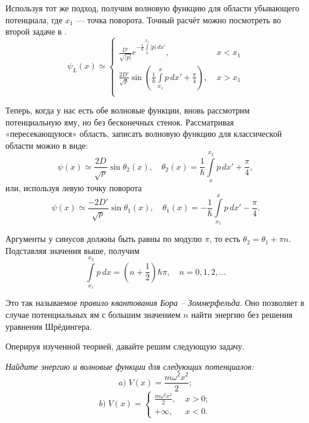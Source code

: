 Используя тот же подход, получим волновую функцию для области убывающего
потенциала, где $x_1$ --- точка поворота. Точный расчёт можно посмотреть во
второй задаче в .
\[
  \psi_L(x) \simeq
  \begin{cases}
    \frac{D'}{\sqrt{|p|}}e^{-\frac{1}{\hbar} \int\limits_{x}^{x_1} |p|\,dx'},\; &x < x_1\\
    \frac{2D'}{\sqrt{p}}\sin\left( \frac{1}{\hbar} \int\limits_{x_1}^{x} p\,dx' + \frac{\pi}{4} \right), \; &x > x_1\\
  \end{cases}
\]

Теперь, когда у нас есть обе волновые функции, вновь рассмотрим потенциальную
яму, но без бесконечных стенок. Рассматривая «пересекающуюся» область, записать
волновую функцию для классической области можно в виде:
\[
  \psi(x) \simeq \frac{2D}{\sqrt{p}}\sin\theta_2(x),\quad \theta_2(x) = \frac{1}{\hbar}\int\limits_{x}^{x_2}p\,dx' + \frac{\pi}{4},
\]
или, используя левую точку поворота
\[
  \psi(x) \simeq \frac{-2D'}{\sqrt{p}}\sin\theta_1(x),\quad \theta_1(x) = -\frac{1}{\hbar}\int\limits_{x_1}^{x}p\,dx' - \frac{\pi}{4}.
\]

Аргументы у синусов должны быть равны по модулю $\pi$, то есть $\theta_2 =
  \theta_1 + \pi n$. Подставляя значения выше, получим
\[
  \int\limits_{x_1}^{x_2}p\, dx = (n + \frac{1}{2})\hbar\pi,\quad n = 0, 1, 2, ...
\]

Это так называемое \textit{правило квантования Бора -- Зоммерфельда}. Оно
позволяет в случае потенциальных ям с большим значением $n$ найти энергию без
решения уравнения Шрёдингера.

Оперируя изученной теорией, давайте решим следующую задачу.

\newpage
\begin{exercise}
  \textit{Найдите энергию и волновые функции для следующих потенциалов:}
  \[
    a)\;V(x) = \frac{m\omega^2 x^2}{2};
  \]
  \[
    b)\;V(x) =
    \begin{cases}
      \frac{m\omega^2 x^2}{2},\;&x > 0;\\
      +\infty,\; &x < 0.
    \end{cases}
  \]
\end{exercise}

